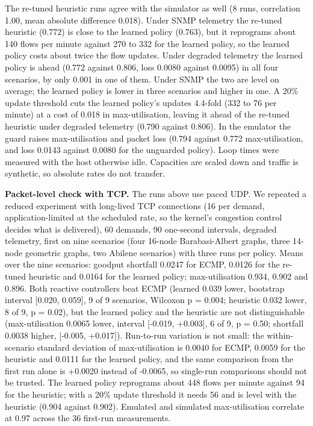 \documentclass[journal]{IEEEtran}
\begin{document}
The re-tuned heuristic runs agree with the simulator as well (8 runs, correlation 1.00, mean absolute difference 0.018). Under SNMP telemetry the re-tuned heuristic (0.772) is close to the learned policy (0.763), but it reprograms about 140 flows per minute against 270 to 332 for the learned policy, so the learned policy costs about twice the flow updates. Under degraded telemetry the learned policy is ahead (0.772 against 0.806, loss 0.0080 against 0.0095) in all four scenarios, by only 0.001 in one of them. Under SNMP the two are level on average; the learned policy is lower in three scenarios and higher in one. A 20\% update threshold cuts the learned policy's updates 4.4-fold (332 to 76 per minute) at a cost of 0.018 in max-utilisation, leaving it ahead of the re-tuned heuristic under degraded telemetry (0.790 against 0.806). In the emulator the guard raises max-utilisation and packet loss (0.794 against 0.772 max-utilisation, and loss 0.0143 against 0.0080 for the unguarded policy). Loop times were measured with the host otherwise idle. Capacities are scaled down and traffic is synthetic, so absolute rates do not transfer.

\textbf{Packet-level check with TCP.} The runs above use paced UDP. We repeated a reduced experiment with long-lived TCP connections (16 per demand, application-limited at the scheduled rate, so the kernel's congestion control decides what is delivered), 60 demands, 90 one-second intervals, degraded telemetry, first on nine scenarios (four 16-node Barabasi-Albert graphs, three 14-node geometric graphs, two Abilene scenarios) with three runs per policy. Means over the nine scenarios: goodput shortfall 0.0247 for ECMP, 0.0126 for the re-tuned heuristic and 0.0164 for the learned policy; max-utilisation 0.934, 0.902 and 0.896. Both reactive controllers beat ECMP (learned 0.039 lower, bootstrap interval [0.020, 0.059], 9 of 9 scenarios, Wilcoxon p = 0.004; heuristic 0.032 lower, 8 of 9, p = 0.02), but the learned policy and the heuristic are not distinguishable (max-utilisation 0.0065 lower, interval [-0.019, +0.003], 6 of 9, p = 0.50; shortfall 0.0038 higher, [-0.005, +0.017]). Run-to-run variation is not small: the within-scenario standard deviation of max-utilisation is 0.0040 for ECMP, 0.0059 for the heuristic and 0.0111 for the learned policy, and the same comparison from the first run alone is +0.0020 instead of -0.0065, so single-run comparisons should not be trusted. The learned policy reprograms about 448 flows per minute against 94 for the heuristic; with a 20\% update threshold it needs 56 and is level with the heuristic (0.904 against 0.902). Emulated and simulated max-utilisation correlate at 0.97 across the 36 first-run measurements.
\end{document}

